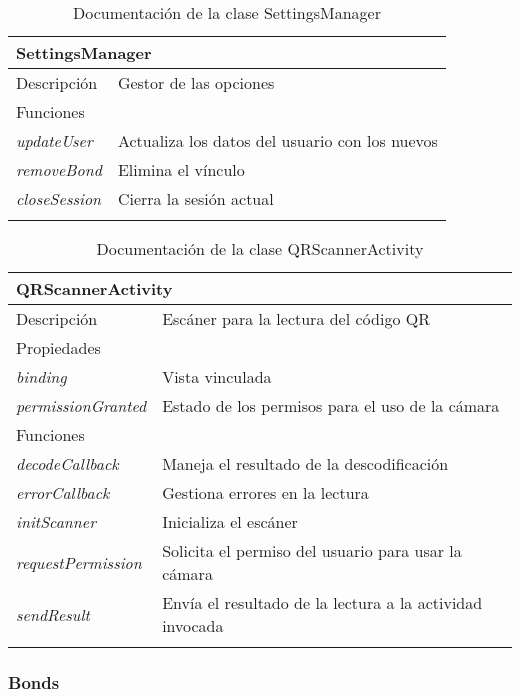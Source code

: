 \vspace{-25pt}
\begin{longtable}{|p{} p{}|}
    \hline
    \multicolumn{2}{|l|}{\textbf{SettingsManager}} \\ \hline \hline
    Descripción      & Gestor de las opciones \\ \hline
    \multicolumn{2}{|l|}{Funciones} \\
    \emph{updateUser} & Actualiza los datos del usuario con los nuevos \\
    \emph{removeBond} & Elimina el vínculo \\
    \emph{closeSession}  & Cierra la sesión actual \\  \hline
    \caption{Documentación de la clase SettingsManager}
    \label{dis:app:settings_manager}
\end{longtable}

\vspace{-25pt}
\begin{longtable}{|p{} p{}|}
    \hline
    \multicolumn{2}{|l|}{\textbf{QRScannerActivity}} \\ \hline \hline
    Descripción      & Escáner para la lectura del código QR \\ \hline
    \multicolumn{2}{|l|}{Propiedades} \\
    \emph{binding}  & Vista vinculada  \\
    \emph{permissionGranted}  & Estado de los permisos para el uso de la cámara  \\ \hline
    \multicolumn{2}{|l|}{Funciones} \\
    \emph{decodeCallback}  & Maneja el resultado de la descodificación \\
    \emph{errorCallback}  & Gestiona errores en la lectura \\ 
    \emph{initScanner}  & Inicializa el escáner \\
    \emph{requestPermission}  & Solicita el permiso del usuario para usar la cámara \\ 
    \emph{sendResult}  & Envía el resultado de la lectura a la actividad invocada \\ \hline
    \caption{Documentación de la clase QRScannerActivity}
    \label{dis:app:qr_scanner_activity}
\end{longtable}

\subsubsection{Bonds}

